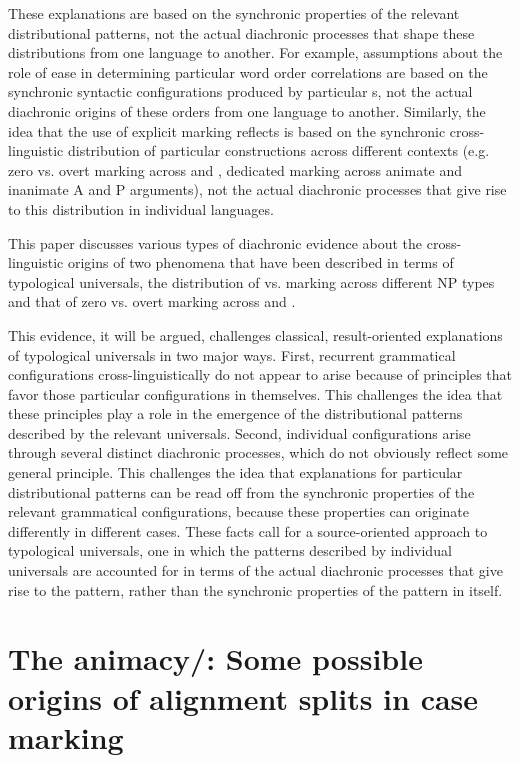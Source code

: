 \documentclass[output=paper]{langsci/langscibook}
\begin{document}
These explanations are based on the synchronic properties of the
relevant distributional patterns, not the actual diachronic processes
that shape these distributions from one language to another. For
example, assumptions about the role of  ease in determining particular word order correlations are based on the synchronic syntactic configurations produced by particular s, not the actual diachronic origins of these orders from one language to another. Similarly, the idea that the use of explicit marking reflects  is based on the synchronic cross-linguistic distribution of particular
constructions across different contexts (e.g. zero vs. overt marking
across  and , dedicated  marking across animate and
inanimate A and P arguments), not the actual diachronic processes that give rise to this distribution in individual languages. 

This paper discusses various types of diachronic evidence about the
cross-linguistic origins of two phenomena that have been described in
terms of typological universals, the distribution of  vs.
  marking  across different NP types and that of
zero vs. overt marking across  and . 

This evidence, it will be argued, challenges classical, result-oriented explanations of typological universals in two major ways.  First, recurrent grammatical configurations cross-linguistically do not appear to arise because of principles that favor those particular configurations in themselves. This challenges the idea that these principles play a
role in the emergence of the distributional patterns described by the
relevant universals.  
Second, individual configurations arise through several distinct
  diachronic processes, which do not obviously reflect some
  general principle. This challenges the idea that explanations for
  particular distributional patterns can be read off from the
  synchronic properties of the relevant grammatical configurations,
  because these properties can originate differently in different
  cases. 
These facts call for a source-oriented approach to typological universals, one in which the patterns described by individual universals are accounted for in terms of the actual diachronic processes that give rise to the pattern, rather than the synchronic properties of the  pattern in itself.

\section{The animacy/: Some possible origins of
  {alignment} splits in {case} marking}
  \label{alignment}
\end{document}
